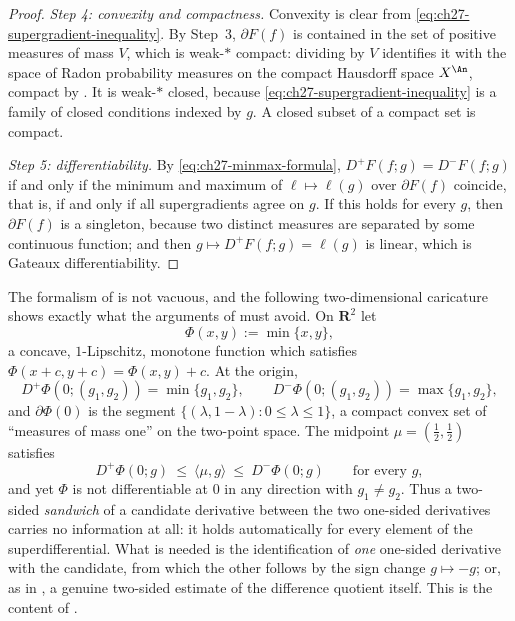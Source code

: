 \begin{proof}
\emph{Step 4: convexity and compactness.}
Convexity is clear from \eqref{eq:ch27-supergradient-inequality}.  By
Step~3, $\partial F(f)$ is contained in the set of positive measures of
mass $V$, which is weak-$*$ compact: dividing by $V$ identifies it
with the space of Radon probability measures on the compact Hausdorff space
$X^{\An}$, compact by .  It is weak-$*$ closed, because
\eqref{eq:ch27-supergradient-inequality} is a family of closed conditions
indexed by $g$.  A closed subset of a compact set is compact.

\emph{Step 5: differentiability.}
By \eqref{eq:ch27-minmax-formula}, $D^+F(f;g)=D^-F(f;g)$ if and only if
the minimum and maximum of $\ell\mapsto\ell(g)$ over $\partial F(f)$
coincide, that is, if and only if all supergradients agree on $g$.  If
this holds for every $g$, then $\partial F(f)$ is a singleton, because
two distinct measures are separated by some continuous function; and then
$g\mapsto D^+F(f;g)=\ell(g)$ is linear, which is Gateaux differentiability.
\end{proof}

\begin{example}
\label{ex:ch27-corner-without-orthogonality}
The formalism of  is not vacuous, and the
following two-dimensional caricature shows exactly what the arguments of
 must avoid.  On $\mathbf R^2$ let
\[
 \Phi(x,y):=\min\{x,y\},
\]
a concave, $1$-Lipschitz, monotone function which satisfies
$\Phi(x+c,y+c)=\Phi(x,y)+c$.  At the origin,
\[
 D^+\Phi(0;(g_1,g_2))=\min\{g_1,g_2\},
 \qquad
 D^-\Phi(0;(g_1,g_2))=\max\{g_1,g_2\},
\]
and $\partial\Phi(0)$ is the segment
$\{(\lambda,1-\lambda):0\leq\lambda\leq1\}$, a compact convex set of
``measures of mass one'' on the two-point space.  The midpoint
$\mu=(\tfrac12,\tfrac12)$ satisfies
\[
 D^+\Phi(0;g)\ \leq\ \langle\mu,g\rangle\ \leq\ D^-\Phi(0;g)
 \qquad\text{for every }g,
\]
and yet $\Phi$ is not differentiable at $0$ in any direction with
$g_1\neq g_2$.  Thus a two-sided \emph{sandwich} of a candidate derivative
between the two one-sided derivatives carries no information at all: it
holds automatically for every element of the superdifferential.  What is
needed is the identification of \emph{one} one-sided derivative with the
candidate, from which the other follows by the sign change
$g\mapsto-g$; or, as in
, a genuine two-sided
estimate of the difference quotient itself.  This is the content of
.
\end{example}

